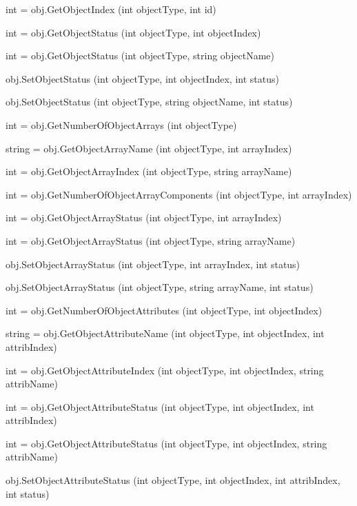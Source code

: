 \begin{DoxyItemize}
\item {\ttfamily int = obj.\-Get\-Object\-Index (int object\-Type, int id)}  
\item {\ttfamily int = obj.\-Get\-Object\-Status (int object\-Type, int object\-Index)}  
\item {\ttfamily int = obj.\-Get\-Object\-Status (int object\-Type, string object\-Name)}  
\item {\ttfamily obj.\-Set\-Object\-Status (int object\-Type, int object\-Index, int status)}  
\item {\ttfamily obj.\-Set\-Object\-Status (int object\-Type, string object\-Name, int status)}  
\item {\ttfamily int = obj.\-Get\-Number\-Of\-Object\-Arrays (int object\-Type)}  
\item {\ttfamily string = obj.\-Get\-Object\-Array\-Name (int object\-Type, int array\-Index)}  
\item {\ttfamily int = obj.\-Get\-Object\-Array\-Index (int object\-Type, string array\-Name)}  
\item {\ttfamily int = obj.\-Get\-Number\-Of\-Object\-Array\-Components (int object\-Type, int array\-Index)}  
\item {\ttfamily int = obj.\-Get\-Object\-Array\-Status (int object\-Type, int array\-Index)}  
\item {\ttfamily int = obj.\-Get\-Object\-Array\-Status (int object\-Type, string array\-Name)}  
\item {\ttfamily obj.\-Set\-Object\-Array\-Status (int object\-Type, int array\-Index, int status)}  
\item {\ttfamily obj.\-Set\-Object\-Array\-Status (int object\-Type, string array\-Name, int status)}  
\item {\ttfamily int = obj.\-Get\-Number\-Of\-Object\-Attributes (int object\-Type, int object\-Index)}  
\item {\ttfamily string = obj.\-Get\-Object\-Attribute\-Name (int object\-Type, int object\-Index, int attrib\-Index)}  
\item {\ttfamily int = obj.\-Get\-Object\-Attribute\-Index (int object\-Type, int object\-Index, string attrib\-Name)}  
\item {\ttfamily int = obj.\-Get\-Object\-Attribute\-Status (int object\-Type, int object\-Index, int attrib\-Index)}  
\item {\ttfamily int = obj.\-Get\-Object\-Attribute\-Status (int object\-Type, int object\-Index, string attrib\-Name)}  
\item {\ttfamily obj.\-Set\-Object\-Attribute\-Status (int object\-Type, int object\-Index, int attrib\-Index, int status)}  

\end{DoxyItemize}
